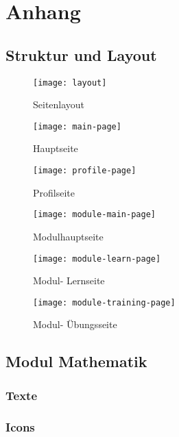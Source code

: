 \setcounter{section}{0}
\setcounter{subsection}{0}
\renewcommand*\thesection{\Alph{section}}

\chapter{Anhang}
\section{Struktur und Layout}

\begin{figure}[!ht]
  \centering
  \texttt{[image: layout]}\\
  \caption{Seitenlayout}
  \label{fig:layout}
\end{figure}

\begin{figure}[!ht]
  \centering
  \texttt{[image: main-page]}\\
  \caption{Hauptseite}
  \label{fig:main-page}
\end{figure}

\begin{figure}[!ht]
  \centering
  \texttt{[image: profile-page]}\\
  \caption{Profilseite}
  \label{fig:profile-page}
\end{figure}

\begin{figure}[!ht]
  \centering
  \texttt{[image: module-main-page]}\\
  \caption{Modulhauptseite}
  \label{fig:module-main-page}
\end{figure}

\begin{figure}[!ht]
  \centering
  \texttt{[image: module-learn-page]}\\
  \caption{Modul- Lernseite}
  \label{fig:module-main-page}
\end{figure}

\begin{figure}[!ht]
  \centering
  \texttt{[image: module-training-page]}\\
  \caption{Modul- Übungsseite}
  \label{fig:module-training-page}
\end{figure}

\section{Modul Mathematik}
\subsection{Texte}
\subsection{Icons}
